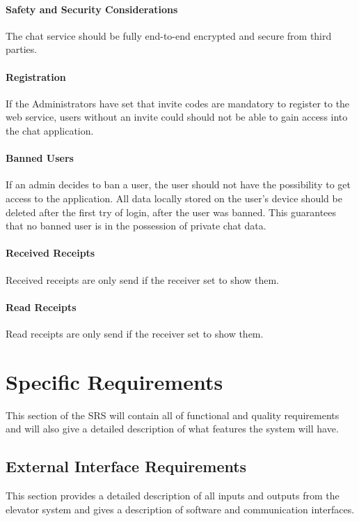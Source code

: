 \paragraph{Safety and Security Considerations}
The chat service should be fully end-to-end encrypted and secure from third parties.

\paragraph{Registration}
If the Administrators have set that invite codes are mandatory to register to the web service, users without an invite
could should not be able to gain access into the chat application.

\paragraph{Banned Users}
If an admin decides to ban a user, the user should not have the possibility to get access to the application.
All data locally stored on the user’s device should be deleted after the first try of login, after the user was banned.
This guarantees that no banned user is in the possession of private chat data.

\paragraph{Received Receipts}
Received receipts are only send if the receiver set to show them.

\paragraph{Read Receipts}
Read receipts are only send if the receiver set to show them.


\section{Specific Requirements}\label{sec:specific-requirements}
This section of the SRS will contain all of functional and quality requirements and will also give a detailed
description of what features the system will have.

\subsection{External Interface Requirements}\label{subsec:external-interface-requirements}
This section provides a detailed description of all inputs and outputs from the elevator system and gives a description
of software and communication interfaces.

